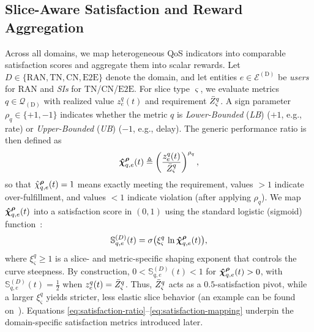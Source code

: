 \documentclass[12pt,lettersize,journal,onecolumn]{IEEEtran}
\begin{document}
\subsection{Slice-Aware Satisfaction and Reward Aggregation}
\label{subsec:satisfaction-model}
Across all domains, we map heterogeneous QoS indicators into comparable satisfaction scores and aggregate them into scalar rewards. Let $D\in\{\mathrm{RAN},\mathrm{TN},\mathrm{CN},\mathrm{E2E}\}$ denote the domain, and let entities $e\in\mathcal{E}^\mathrm{(D)}$ be \textit{users} for $\mathrm{RAN}$ and \textit{SIs} for $\mathrm{TN}$/$\mathrm{CN}$/$\mathrm{E2E}$. For slice type $\varsigma$, we evaluate metrics $q\in\mathcal{Q}_\mathrm{(D)}$ with realized value $z^{q}_{e}(t)$ and requirement $\Bar{Z}^{q}_{\varsigma}$. A sign parameter $\rho_q\in\{+1,-1\}$ indicates whether the metric $q$ is \textit{Lower-Bounded} (\textit{LB}) ($+1$, e.g., rate) or \textit{Upper-Bounded} (\textit{UB}) ($-1$, e.g., delay). The generic performance ratio is then defined as 
\begin{equation}
\boldsymbol{\Hat{\chi}}^{\boldsymbol{\rho}}_{q,e}(t)
\triangleq
\left(\frac{z^{q}_{e}(t)}{\Bar{Z}^{q}_{\varsigma}}\right)^{\rho_q},
\label{eq:satisfaction-ratio}
\end{equation}
so that $\Hat{\chi}^{\boldsymbol{\rho}}_{q,e}(t)=1$ means exactly meeting the requirement, values $>1$ indicate over-fulfillment, and values $<1$ indicate violation (after applying $\rho_q$). We map $\boldsymbol{\Hat{\chi}}^{\boldsymbol{\rho}}_{q,e}(t)$ into a satisfaction score in $(0,1)$ using the standard logistic (sigmoid) function~\cite{camad24ebrahimi}: %
\begin{equation}
\mathbb{S}^{(D)}_{q,e}(t)
=
\sigma\bigl(\xi^{q}_{\varsigma}\,\ln \boldsymbol{\Hat{\chi}}^{\boldsymbol{\rho}}_{q,e}(t)\bigr),
\label{eq:satisfaction-mapping}
\end{equation}
where $\xi^{q}_{\varsigma}\ge1$ is a slice- and metric-specific shaping exponent that controls the curve steepness. By construction, $0<\mathbb{S}^{(D)}_{q,e}(t)<1$ for $\boldsymbol{\Hat{\chi}}^{\boldsymbol{\rho}}_{q,e}(t)>0$, with $\mathbb{S}^{(D)}_{q,e}(t)=\tfrac{1}{2}$ when $z^{q}_{e}(t)=\Bar{Z}^{q}_{\varsigma}$. Thus, $\Bar{Z}^{q}_{\varsigma}$ acts as a $0.5$-satisfaction pivot, while a larger $\xi^{q}_{\varsigma}$ yields stricter, less elastic slice behavior (an example can be found on~\cite[Fig.~2]{camad24ebrahimi}). Equations \eqref{eq:satisfaction-ratio}--\eqref{eq:satisfaction-mapping} underpin the domain-specific satisfaction metrics introduced later.
\end{document}
